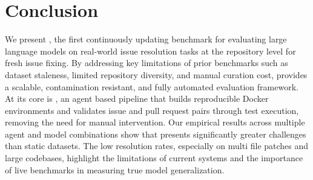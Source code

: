
\section{Conclusion}
We present \benchmark{}, the first continuously updating benchmark for evaluating large language models on real-world issue resolution tasks at the repository level for fresh issue fixing. By addressing key limitations of prior benchmarks such as dataset staleness, limited repository diversity, and manual curation cost, \benchmark{} provides a scalable, contamination resistant, and fully automated evaluation framework. At its core is \method{}, an agent based pipeline that builds reproducible Docker environments and validates issue and pull request pairs through test execution, removing the need for manual intervention. Our empirical results across multiple agent and model combinations show that \benchmark{} presents significantly greater challenges than static datasets. The low resolution rates, especially on multi file patches and large codebases, highlight the limitations of current systems and the importance of live benchmarks in measuring true model generalization.